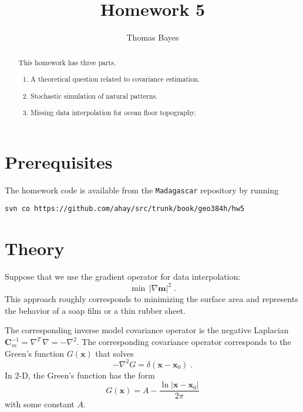 \author{Thomas Bayes}
\title{Homework 5}

\begin{abstract}
  This homework has three parts. 
  \begin{enumerate}
    \item A theoretical question related to covariance estimation.
    \item Stochastic simulation of natural patterns.
    \item Missing data interpolation for ocean floor topography.
  \end{enumerate}
\end{abstract}

\section{Prerequisites}

The homework code is available from the \texttt{Madagascar} repository
by running
\begin{verbatim}
svn co https://github.com/ahay/src/trunk/book/geo384h/hw5
\end{verbatim}

\section{Theory}

Suppose that we use the gradient operator for data interpolation:
\begin{equation}
\label{eq:grad}
\min\,\left|\nabla \mathbf{m}\right|^2\;.
\end{equation}  
This approach roughly corresponds to minimizing the surface area and
represents the behavior of a soap film or a thin rubber sheet.

The corresponding inverse model covariance operator is the negative Laplacian
$\mathbf{C}_m^{-1}=\nabla^T\,\nabla=-\nabla^2$. The corresponding
covariance operator corresponds to the Green's function $G(\mathbf{x})$ that solves
\begin{equation}
\label{eq:green}
-\nabla^2 G = \delta(\mathbf{x}-\mathbf{x}_0)\;.
\end{equation}
In 2-D, the Green's function has the form 
\begin{equation}
\label{eq:g2d}
G(\mathbf{x}) = \displaystyle A - \frac{\ln |\mathbf{x}-\mathbf{x}_0|}{2\pi}
\end{equation}
with some constant $A$.

